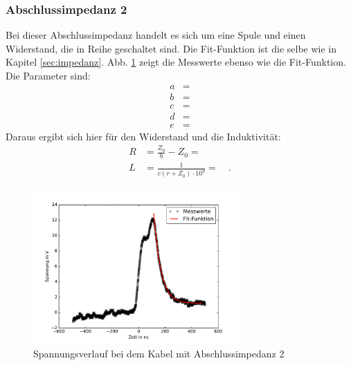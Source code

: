 \subsubsection{Abschlussimpedanz 2}
Bei dieser Abschlussimpedanz handelt es sich um eine Spule und einen Widerstand, die in Reihe geschaltet sind. Die Fit-Funktion ist die selbe wie in Kapitel \ref{sec:impedanz}. Abb. \ref{fig:box23} zeigt die Messwerte ebenso wie die Fit-Funktion. Die Parameter sind:
\begin{align}
	a &=  \\
	b &=  \\
	c &=  \\
	d &=  \\
	e &=  
\end{align}
Daraus ergibt sich hier für den Widerstand und die Induktivität:
\begin{align}
	R &= \frac{Z_0}{b} - Z_0 =  \\
	L &= \frac{1}{ c (r + Z_0) \cdot 10^9} =  \quad.
\end{align}

\begin{figure}
	\centering
	\includegraphics[width=0.7\textwidth]{Box23/Box23.pdf}
	\caption{Spannungsverlauf bei dem Kabel mit Abschlussimpedanz 2}
	\label{fig:box23}
\end{figure}
\clearpage
